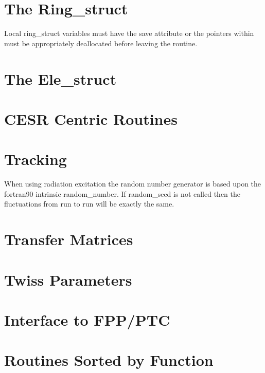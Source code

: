\documentclass{book}
\begin{document}
\chapter{The Ring\_struct}

Local ring_struct variables must have the save attribute or
the pointers within must be appropriately deallocated
before leaving the routine.

\chapter{The Ele\_struct}

\chapter{CESR Centric Routines}

\chapter{Tracking}

When using radiation excitation the random number generator is based
upon the fortran90 intrinsic random_number. If random_seed is not called
then the fluctuations from run to run will be exactly the same.

\chapter{Transfer Matrices}

\chapter{Twiss Parameters}

\chapter{Interface to FPP/PTC}

\chapter{Routines Sorted by Function}
\end{document}
